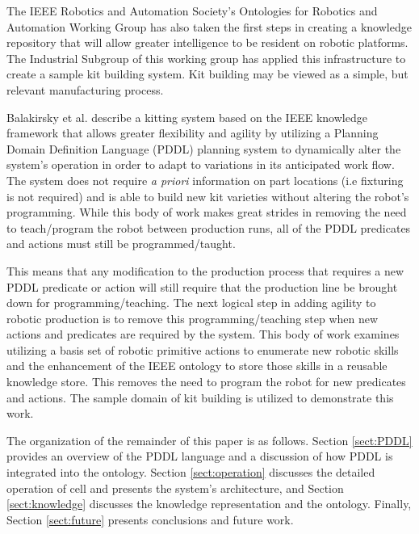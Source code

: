 The IEEE Robotics and Automation Society's Ontologies for Robotics and Automation Working Group \cite{schlenoff2012} has also taken the 
first steps in creating a knowledge repository that will
allow greater intelligence to be resident on robotic platforms.
The 
Industrial Subgroup of this working group has applied 
this infrastructure to 
create a sample kit building
system.  Kit building may be viewed as a simple, but relevant
manufacturing process. 

Balakirsky et al. \cite{Balakirsky2013} describe a kitting 
system based on the IEEE knowledge framework that
allows greater flexibility and agility by utilizing a
Planning Domain Definition Language (PDDL) \cite{PDDL} planning
system to dynamically alter the system's operation in order
to adapt to variations in its anticipated work flow. The system
does not require {\it a priori} information on part locations (i.e
fixturing is not required) and is able to build new kit varieties
without altering the robot's programming. While this body of
work makes great strides in removing the need to teach/program
the robot between production runs, all of the PDDL predicates and
actions must still be programmed/taught. 

This means that any
modification to the production process that requires a new
PDDL predicate or action will still require that the production 
line be brought down for programming/teaching. The next logical step
in adding agility to robotic production is to remove this 
programming/teaching step when new actions and predicates
are required by the system. 
This body of work examines utilizing a basis set of robotic
primitive actions to enumerate new robotic skills and the
enhancement of the IEEE ontology to store those skills in a reusable
knowledge store. This removes the need to program
the robot for new predicates and actions. The sample domain of kit building is utilized
to demonstrate this work.

The organization of the remainder of this paper is as follows.
Section \ref{sect:PDDL} provides an overview of the PDDL language and
a discussion of how PDDL is integrated into the ontology. 
Section \ref{sect:operation} discusses the detailed operation of cell
and presents the system's architecture, and Section 
\ref{sect:knowledge} discusses the knowledge representation and
the ontology. Finally, Section \ref{sect:future} presents
conclusions and future work.
%
